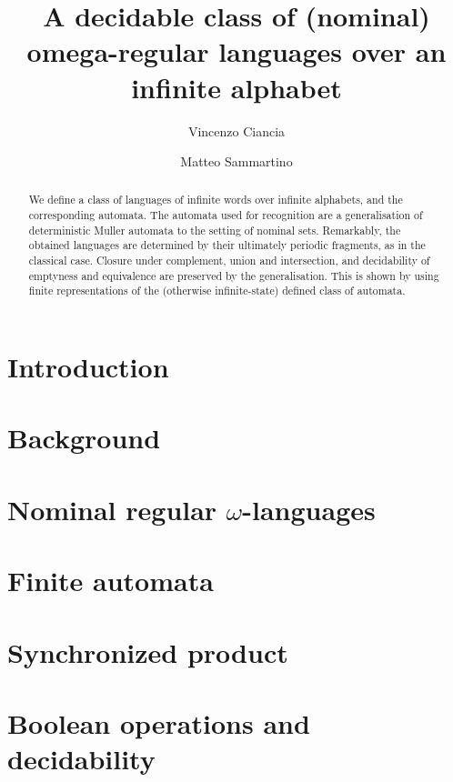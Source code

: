 \documentclass[orivec]{llncs}
\title{A decidable class of (nominal) omega-regular languages over an infinite alphabet}
\author{Vincenzo Ciancia\inst{1} \and Matteo Sammartino\inst{2}}
\institute{ISTI-CNR, Pisa \and Dipartimento di Informatica, Universit\`a di Pisa, Pisa }
\begin{document}
\maketitle

\begin{abstract}
 We define a class of languages of infinite words over infinite alphabets, and the corresponding automata. The automata used for recognition are a generalisation of deterministic Muller automata to the setting of nominal sets. Remarkably, the obtained languages are determined by their ultimately periodic fragments, as in the classical case. Closure under complement, union and intersection, and decidability of emptyness and equivalence are preserved by the generalisation. This is shown by using finite representations of the (otherwise infinite-state) defined class of automata.
\end{abstract}

\section{Introduction}\label{sec:introduction}

\section{Background}\label{sec:background}

\section{Nominal regular $\omega$-languages}\label{sec:languages}


\section{Finite automata}\label{sec:hd-automata}



\section{Synchronized product}\label{sec:sync-product}


\section{Boolean operations and decidability}\label{sec:boolean-operations-decidability}
\end{document}
